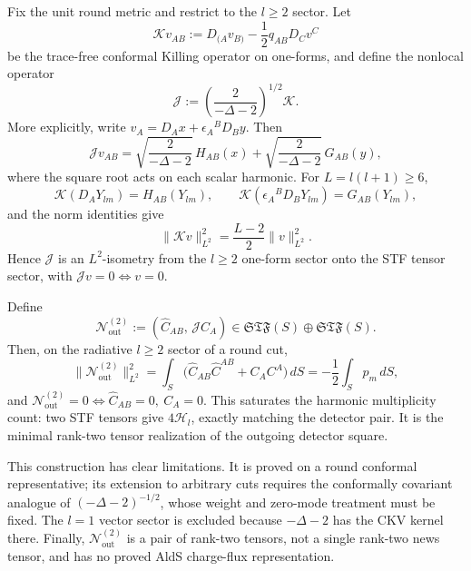 \documentclass[11pt,a4paper]{article}
\newcommand{\cN}{\mathcal{N}}
\begin{document}
Fix the unit round metric and restrict to the \(l\ge2\) sector.  Let
\begin{equation}
  \mathcal K v_{AB}
  :=
  D_{(A}v_{B)}-\frac12 q_{AB}D_Cv^C
\end{equation}
be the trace-free conformal Killing operator on one-forms, and define the nonlocal operator
\begin{equation}
  \mathcal J
  :=
  \left(\frac{2}{-\Delta-2}\right)^{1/2}\mathcal K .
\end{equation}
More explicitly, write \(v_A=D_Ax+\epsilon_A{}^BD_By\).  Then
\begin{equation}
  \mathcal J v_{AB}
  =
  \sqrt{\frac{2}{-\Delta-2}}\,H_{AB}(x)
  +
  \sqrt{\frac{2}{-\Delta-2}}\,G_{AB}(y),
\end{equation}
where the square root acts on each scalar harmonic.  For \(L=l(l+1)\ge6\),
\begin{equation}
  \mathcal K(D_AY_{lm})=H_{AB}(Y_{lm}),
  \qquad
  \mathcal K(\epsilon_A{}^BD_BY_{lm})=G_{AB}(Y_{lm}),
\end{equation}
and the norm identities give
\begin{equation}
  \|\mathcal K v\|_{L^2}^2
  =
  \frac{L-2}{2}\|v\|_{L^2}^2 .
\end{equation}
Hence \(\mathcal J\) is an \(L^2\)-isometry from the \(l\ge2\) one-form sector onto the STF tensor sector, with \(\mathcal Jv=0\iff v=0\).

Define
\begin{equation}\label{eq:rank2-pair-news}
  \cN^{(2)}_{\mathrm{out}}
  :=
  (\hat C_{AB},\,\mathcal J C_A)
  \in
  \mathfrak{STF}(S)\oplus\mathfrak{STF}(S) .
\end{equation}
Then, on the radiative \(l\ge2\) sector of a round cut,
\begin{equation}
  \|\cN^{(2)}_{\mathrm{out}}\|_{L^2}^2
  =
  \int_S\big(\hat C_{AB}\hat C^{AB}+C_AC^A\big)\,dS
  =
  -\frac12\int_S p_m\,dS ,
\end{equation}
and \(\cN^{(2)}_{\mathrm{out}}=0\iff \hat C_{AB}=0,\ C_A=0\).  This saturates the harmonic multiplicity count: two STF tensors give \(4\mathcal H_l\), exactly matching the detector pair.  It is the minimal rank-two tensor realization of the outgoing detector square.

This construction has clear limitations.  It is proved on a round conformal representative; its extension to arbitrary cuts requires the conformally covariant analogue of \((-\Delta-2)^{-1/2}\), whose weight and zero-mode treatment must be fixed.  The \(l=1\) vector sector is excluded because \(-\Delta-2\) has the CKV kernel there.  Finally, \(\cN^{(2)}_{\mathrm{out}}\) is a pair of rank-two tensors, not a single rank-two news tensor, and has no proved AldS charge-flux representation.
\end{document}
